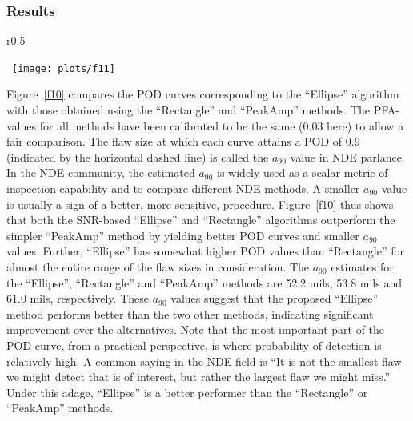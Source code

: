 \documentclass[12pt]{article}
\begin{document}
\subsubsection{Results}
\begin{wrapfigure}{r}{0.5\textwidth}
\vspace{-0.2in}
\begin{center}
\mbox{
  \texttt{[image: plots/f11]}
}
\vspace{-0.4in}
\caption{POD curves for the proposed algorithm and the two alternative methods.}
\label{f10}
\end{center}
\vspace{-0.4in}
\end{wrapfigure}
Figure~\ref{f10} compares the POD curves corresponding to the
``Ellipse'' algorithm  with those  obtained 
using the ``Rectangle'' and ``PeakAmp'' methods. The
PFA-values for all methods have been calibrated to be the same (0.03 here) to
allow a fair comparison. The flaw size at which each curve attains a
POD of 0.9 (indicated by the horizontal dashed line) is called the 
$a_{90} $ value in NDE parlance. In the NDE community, the estimated
$a_{90}$  is widely used as a scalar metric of inspection
capability and to 
compare  different NDE methods. A smaller $a_{90} $ value is usually a
sign of a better, more sensitive, procedure.  Figure~\ref{f10}
thus shows that both the SNR-based ``Ellipse'' and
``Rectangle'' algorithms outperform the simpler ``PeakAmp'' method
by yielding better POD curves and  smaller $a_{90} $ values. Further,
 ``Ellipse''  has somewhat higher POD values
than ``Rectangle'' for  almost the entire range of the flaw sizes
in consideration. The $a_{90} $ estimates for the  ``Ellipse'',
``Rectangle'' and ``PeakAmp'' methods are 52.2 mils, 53.8
mils and 61.0 mils, respectively. These $a_{90} $ values 
suggest  that the proposed ``Ellipse'' method performs better
than the two  
other methods, indicating significant improvement over the alternatives.  
Note that the most important part of the POD curve, from a practical
perspective, is where probability of detection is relatively high. A
common saying in the NDE  field is ``It is not the smallest flaw we
might detect that is of interest, but rather  the largest flaw we
might miss.'' Under this adage,  ``Ellipse''  is a better performer
than the ``Rectangle'' or ``PeakAmp'' methods. 
\end{document}
